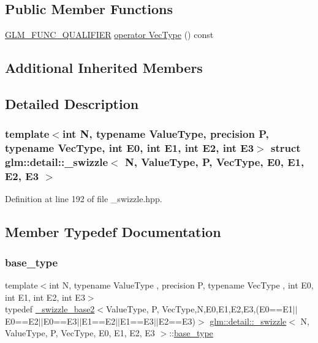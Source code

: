 \subsection*{Public Member Functions}
\begin{DoxyCompactItemize}
\item 
\hyperlink{setup_8hpp_a33fdea6f91c5f834105f7415e2a64407}{G\+L\+M\+\_\+\+F\+U\+N\+C\+\_\+\+Q\+U\+A\+L\+I\+F\+I\+ER} \hyperlink{structglm_1_1detail_1_1__swizzle_a969ed3f7ce07614769a5f623045d1027}{operator Vec\+Type} () const
\end{DoxyCompactItemize}
\subsection*{Additional Inherited Members}


\subsection{Detailed Description}
\subsubsection*{template$<$int N, typename Value\+Type, precision P, typename Vec\+Type, int E0, int E1, int E2, int E3$>$\newline
struct glm\+::detail\+::\+\_\+swizzle$<$ N, Value\+Type, P, Vec\+Type, E0, E1, E2, E3 $>$}



Definition at line 192 of file \+\_\+swizzle.\+hpp.



\subsection{Member Typedef Documentation}
\mbox{\label{structglm_1_1detail_1_1__swizzle_acf7dfa9d7456eb833c247473c5a045f4}} 
\subsubsection{\texorpdfstring{base\+\_\+type}{base\_type}}
{\footnotesize\ttfamily template$<$int N, typename Value\+Type , precision P, typename Vec\+Type , int E0, int E1, int E2, int E3$>$ \\
typedef \hyperlink{structglm_1_1detail_1_1__swizzle__base2}{\+\_\+swizzle\+\_\+base2}$<$Value\+Type, P, Vec\+Type,N,E0,E1,E2,E3,(E0==E1$\vert$$\vert$E0==E2$\vert$$\vert$E0==E3$\vert$$\vert$E1==E2$\vert$$\vert$E1==E3$\vert$$\vert$E2==E3)$>$ \hyperlink{structglm_1_1detail_1_1__swizzle}{glm\+::detail\+::\+\_\+swizzle}$<$ N, Value\+Type, P, Vec\+Type, E0, E1, E2, E3 $>$\+::\hyperlink{structglm_1_1detail_1_1__swizzle_acf7dfa9d7456eb833c247473c5a045f4}{base\+\_\+type}}



